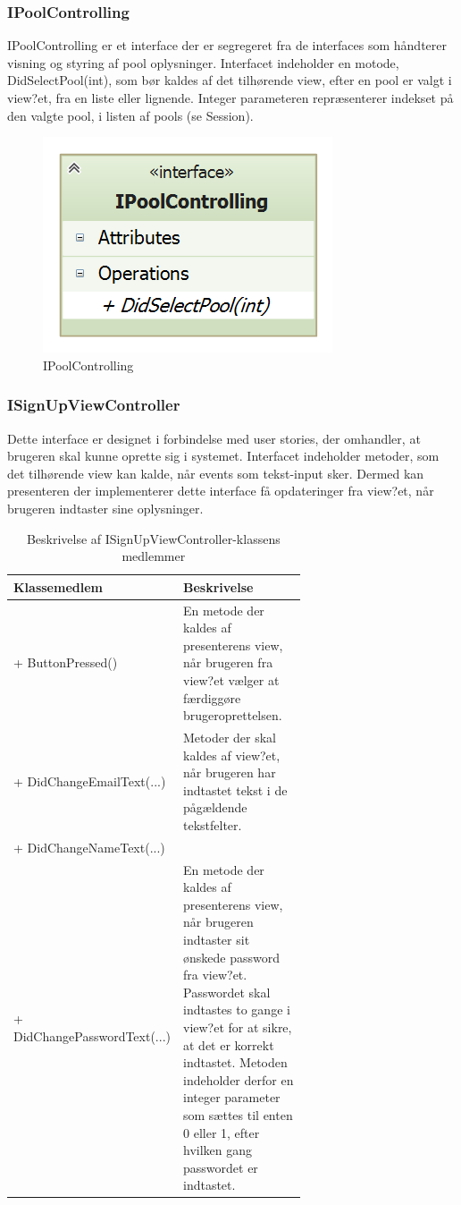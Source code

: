 \subsubsection{IPoolControlling}
IPoolControlling er et interface der er segregeret fra de interfaces som håndterer visning og styring af pool oplysninger. Interfacet indeholder en motode, DidSelectPool(int), som bør kaldes af det tilhørende view, efter en pool er valgt i view?et, fra en liste eller lignende. Integer parameteren repræsenterer indekset på den valgte pool, i listen af pools (se Session).  
\begin{figure}
	\centering
	\includegraphics[width=0.3\linewidth]{figs/design/application_ipoolcontrolling}
	\caption{IPoolControlling}
	\label{fig:application_ipoolcontrolling}
\end{figure}

\subsubsection{ISignUpViewController}
Dette interface er designet i forbindelse med user stories, der omhandler, at brugeren skal kunne oprette sig i systemet. Interfacet indeholder metoder, som det tilhørende view kan kalde, når events som tekst-input sker. Dermed kan presenteren der implementerer dette interface få opdateringer fra view?et, når brugeren indtaster sine oplysninger.

\begin{table}
	\centering
	\begin{tabular}{| l | p{0.65\linewidth} |}
		\toprule
		\textbf{Klassemedlem}	& \textbf{Beskrivelse} \\
		\midrule
		+ ButtonPressed()				& En metode der kaldes af presenterens view, når brugeren fra view?et vælger at færdiggøre brugeroprettelsen.	\\\hline
		+ DidChangeEmailText(...) 			& Metoder der skal kaldes af view?et, når brugeren har indtastet tekst i de pågældende tekstfelter. \\
		+ DidChangeNameText(...)  			& \\\hline
		+ DidChangePasswordText(...) 				& En metode der kaldes af presenterens view, når brugeren indtaster sit ønskede password fra view?et. Passwordet skal indtastes to gange i view?et for at sikre, at det er korrekt indtastet. Metoden indeholder derfor en integer parameter som sættes til enten 0 eller 1, efter hvilken gang passwordet er indtastet. \\
		\bottomrule
		\end{tabular}
	\caption{Beskrivelse af ISignUpViewController-klassens medlemmer}
	\label{tab:table_design_isignupviewcontroller}	
\end{table}

